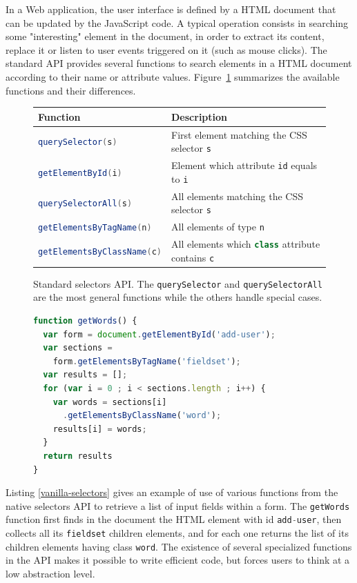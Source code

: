 \documentclass{llncs}
\newcommand{\code}[1]{\lstinline[language=Scala,columns=fixed,basicstyle=\footnotesize]|#1|}
\begin{document}
In a Web application, the user interface is defined by a HTML document that can be updated by the
JavaScript code. A typical operation consists in searching some "interesting" element in the
document, in order to extract its content, replace it or listen to user events triggered on it (such
as mouse clicks). The standard API provides several functions to search elements in a HTML document
according to their name or attribute values. Figure~\ref{selectors-api} summarizes the available
functions and their differences.

\begin{figure}[htb]
\begin{center}
\begin{tabular}{| l | p{3cm} |}
\hline
Function & Description \\
\hline
\code{querySelector(s)} & First element matching the CSS selector \code{s} \\
\hline
\code{getElementById(i)} & Element which attribute \code{id} equals to \code{i} \\
\hline
\code{querySelectorAll(s)} & All elements matching the CSS selector \code{s} \\
\hline
\code{getElementsByTagName(n)} & All elements of type \code{n} \\
\hline
\code{getElementsByClassName(c)} & All elements which \code{class} attribute contains \code{c} \\
\hline
\end{tabular}
\end{center}
\caption{Standard selectors API. The \code{querySelector} and \code{querySelectorAll} are the most
general functions while the others handle special cases.}
\label{selectors-api}
\end{figure}

\begin{figure}[htb]
\begin{lstlisting}[language=JavaScript,label=vanilla-selectors,caption=Searching elements using the
native selectors API]
function getWords() {
  var form = document.getElementById('add-user');
  var sections =
    form.getElementsByTagName('fieldset');
  var results = [];
  for (var i = 0 ; i < sections.length ; i++) {
    var words = sections[i]
      .getElementsByClassName('word');
    results[i] = words;
  }
  return results
}
\end{lstlisting}
\end{figure}

Listing \ref{vanilla-selectors} gives an example of use of various functions from the native
selectors API to retrieve a list of input fields within a form. The \code{getWords} function first finds in the document the HTML element with id \code{add-user}, then collects all its \code{fieldset} children elements, and for each one returns the list of its children elements having class \code{word}. The existence of several specialized functions in the API makes it possible to write efficient code, but forces users to think at a low abstraction level.
\end{document}
